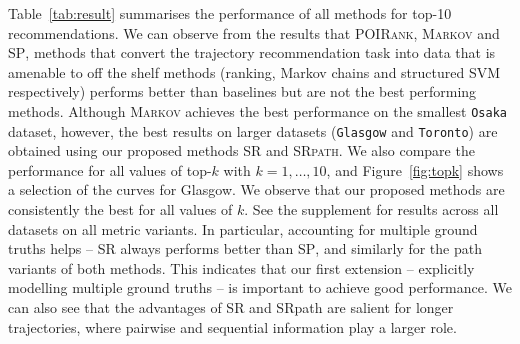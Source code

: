 

Table~\ref{tab:result} summarises the performance of all methods for top-10 recommendations.
We can observe from the results that \textsc{POIRank}, \textsc{Markov} and \textsc{SP},
methods that convert the trajectory recommendation task
into data that is amenable to off the shelf methods (ranking, Markov chains and structured SVM respectively)
performs better than baselines but are not the best performing methods.
Although \textsc{Markov} achieves the best performance on the smallest \texttt{Osaka} dataset,
however, the best results on larger datasets (\ie \texttt{Glasgow} and \texttt{Toronto}) are obtained using our proposed methods
\textsc{SR} and \textsc{SRpath}.
We also compare the performance for all values of top-$k$ with $k=1,\ldots,10$, and
Figure~\ref{fig:topk} shows a selection of the curves for Glasgow. We observe that
our proposed methods are consistently the best for all values of $k$.
See the supplement for results across all datasets on all metric variants.
In particular,
accounting for multiple ground truths helps --
\textsc{SR} always performs better than \textsc{SP},
and similarly for the {\sc path} variants of both methods.
This indicates that our first extension -- explicitly modelling multiple ground truths
 -- is important to achieve good performance.
We can also see that the advantages of {\sc SR} %
and {\sc SRpath} are salient for longer trajectories, where pairwise and sequential information play a larger role.

